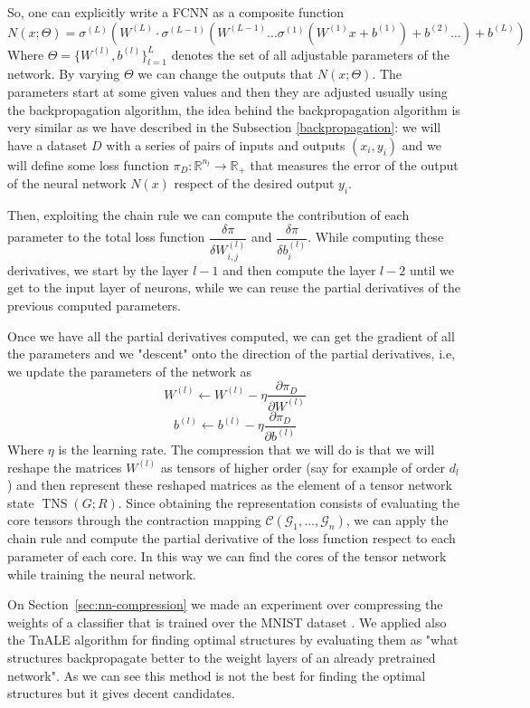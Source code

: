 \documentclass[11pt,a4paper,openright,oneside]{book}
\numberwithin{equation}{section}
\newcommand{\secref}[1]{Section~\ref{#1}}
\DeclareMathOperator{\TNS}{TNS}
\begin{document}
{So, one can explicitly write a \gls{FCNN} as a composite function
$$N(x; \Theta) = \sigma^{(L)}(W^{(L)} \cdot \sigma^{(L - 1)}( W^{(L-1)} \dots \sigma^{(1)}(W^{(1)} x + b^{(1)}) + b^{(2)} \dots ) + b^{(L)})$$
Where $\Theta = \{W^{(l)}, b^{(l)}\}_{l=1}^L$ denotes the set of all adjustable parameters of the network.
By varying $\Theta$ we can change the outputs that $N(x; \Theta)$. The
parameters start at some given values and then they are adjusted usually using the backpropagation algorithm, the idea behind the backpropagation
algorithm is very similar as we have  
described in the Subsection \ref{backpropagation}: we will have a dataset $D$ with a series of pairs of inputs and outputs $(x_i, y_i)$ and we
will define some loss function $\pi_D : \mathbb{R}^{n_l} \rightarrow \mathbb{R}_+$ that measures the error of the output of the neural network $N(x)$ respect of the desired output $y_i$.

Then, exploiting the chain rule we can compute the contribution of each parameter to the total loss function $\dfrac{\delta \pi}{\delta W^{(l)}_{i, j}}$
and $\dfrac{\delta \pi}{\delta b^{(l)}_i}$. While computing these derivatives, we start by the layer $l-1$ and then
compute the layer $l-2$ until we get to the input layer of neurons, while we can reuse the partial derivatives of the previous
computed parameters.

Once we have all the partial derivatives computed, we can get the gradient of all the parameters and we "descent" onto the direction of
the partial derivatives, i.e, we update the parameters of the network as
$$W^{(l)} \leftarrow W^{(l)} - \eta \frac{\partial \pi_D}{\partial W^{(l)}}$$
$$b^{(l)} \leftarrow b^{(l)} - \eta \frac{\partial \pi_D}{\partial b^{(l)}}$$
Where $\eta$ is the learning rate. The compression that we will do is that we will reshape the matrices $W^{(l)}$ as tensors
of higher order (say for example of order $d_l$) and then represent these reshaped matrices as the element of a tensor network state
$\TNS(G; R)$. Since obtaining the representation consists of evaluating the core tensors through the contraction
mapping $\mathcal{C}(\mathcal{G}_1, \dots, \mathcal{G}_n)$, we can apply the chain rule and compute the partial derivative of the
loss function respect to each parameter of each core. In this way we can find the cores of the tensor network while training the neural network.

On \secref{sec:nn-compression} we made an experiment over compressing the weights of a classifier that is trained over the MNIST dataset \cite{dengMNISTDatabaseHandwritten2012}.
We applied also the TnALE algorithm for finding optimal structures by evaluating them as "what structures backpropagate better to the
weight layers of an already pretrained network". As we can see this method is not the best for finding the optimal structures
but it gives decent candidates.



}
\end{document}
